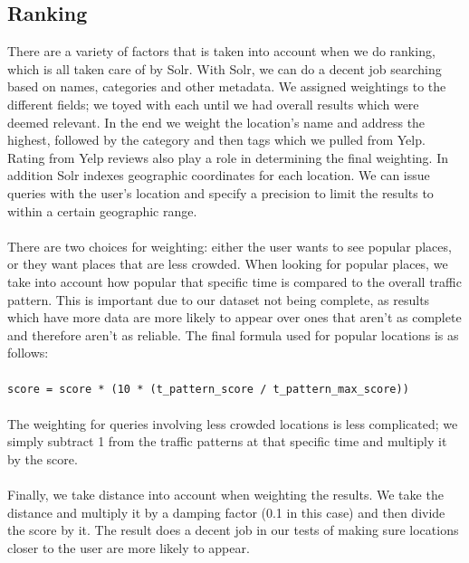 \documentclass{article}
\begin{document}
\subsection{Ranking}
There are a variety of factors that is taken into account when we do ranking, which is all taken care of by Solr. With Solr, we can do a
decent job searching based on names, categories and other metadata. We assigned weightings to the different fields; we toyed with
each until we had overall results which were deemed relevant. In the end we weight the location's name and address the highest, followed 
by the category and then tags which we pulled from Yelp. Rating from Yelp reviews also play a role in determining the final weighting.
In addition Solr indexes geographic coordinates for each location. We can issue
queries with the user's location and specify a precision to limit the results to within a certain geographic range.
\\ \\
There are two choices for weighting: either the user wants to see popular places, or they want places that are less crowded. When looking 
for popular places, we take into account how popular that specific time is compared to the overall traffic pattern. This is important due
to our dataset not being complete, as results which have more data are more likely to appear over ones that aren't as complete and therefore
aren't as reliable. The final formula used for popular locations is as follows:
\\ \\
\verb|score = score * (10 * (t_pattern_score / t_pattern_max_score))|
\\ \\
The weighting for queries involving less crowded locations is less complicated; we simply subtract 1 from the traffic patterns at that specific time and multiply it by the score.
\\ \\
Finally, we take distance into account when weighting the results. We take the distance and multiply it by a damping factor (0.1 in this case) and then divide the score by it. The result does a decent job in our tests of making sure locations closer to the user are more likely to appear.
\end{document}
